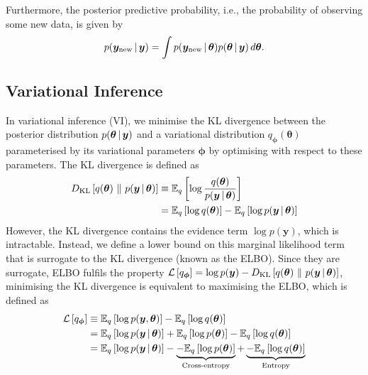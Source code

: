 \documentclass[10pt,a4paper,twocolumn]{article}
\begin{document}
Furthermore, the posterior predictive probability, i.e., the probability of observing some new data, is given by
\begin{align}
    p(\bm y_{\mathrm{new}} \, | \, \bm y) = \int p(\bm y_{\mathrm{new}} \, | \, \bm \theta) p(\bm \theta \, | \, \bm y)\,d\bm\theta.
\end{align}

\subsection{Variational Inference}

In variational inference (VI), we minimise the KL divergence between the posterior distribution \(p(\bm \theta \, | \, \bm y)\) and a variational distribution \(q_{\bm \phi}(\bm \theta)\) parameterised by its variational parameters \(\bm \phi\) by optimising with respect to these parameters.
The KL divergence is defined as
\begin{align}
    D_{\mathrm{KL}}\left[q(\bm \theta)\ \lVert\ p(\bm y \, | \, \bm \theta)\right] \equiv{} & \mathbb{E}_{q}\left[\log \frac{q(\bm \theta)}{p(\bm y \, | \, \bm \theta)}\right] \label{eq:kld}  \\
    ={}                                                      & \mathbb{E}_{q}\left[\log q(\bm \theta)\right] - \mathbb{E}_{q}\left[\log p(\bm y \, | \, \bm \theta)\right] \nonumber
\end{align}
However, the KL divergence contains the evidence term \(\log p(\bm y)\), which is intractable.
Instead, we define a lower bound on this marginal likelihood term that is surrogate to the KL divergence (known as the ELBO).
Since they are surrogate, ELBO fulfils the property \(\mathcal{L}\left[q_{\bm \phi}\right] = \log p(\bm y) - D_{\mathrm{KL}}\left[q(\bm \theta)\ \lVert\ p(\bm y \, | \, \bm \theta)\right]\), minimising the KL divergence is equivalent to maximising the ELBO, which is defined as
\begin{align}
    \mathcal{L}\left[q_{\bm \phi}\right] \equiv{} & \mathbb{E}_{q}\left[\log p(\bm y, \bm \theta)\right] - \mathbb{E}_{q}\left[\log q(\bm \theta)\right] \nonumber                                                                                                               \\
    ={}            & \mathbb{E}_{q}\left[\log p(\bm y \, | \, \bm \theta)\right] + \mathbb{E}_{q}\left[\log p(\bm \theta)\right] - \mathbb{E}_{q}\left[\log q(\bm \theta)\right] \nonumber                                                                             \\
    ={}            & \mathbb{E}_{q}\left[\log p(\bm y \, | \, \bm \theta)\right] - \underbrace{- \mathbb{E}_{q}\left[\log p(\bm \theta)\right]}_{\text{Cross-entropy}} + \underbrace{- \mathbb{E}_{q}\left[\log q(\bm \theta)\right]}_{\text{Entropy}} \label{eq:elbo}
\end{align}
\end{document}
